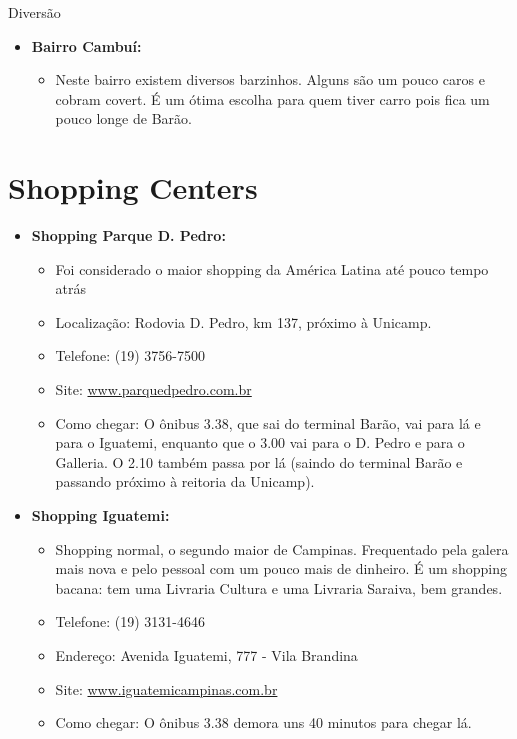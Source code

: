 \begin{story}{Diversão}
\begin{itemize}
\begin{itemize}
\item \textbf{Bairro Cambuí:} 
\begin{itemize}
\item Neste bairro existem diversos barzinhos. Alguns são um pouco caros e cobram covert. É um ótima escolha para quem tiver carro pois fica um pouco longe de Barão.
\end{itemize}

\end{itemize}

\section*{Shopping Centers}

\begin{itemize}

\item \textbf{Shopping Parque D. Pedro:}
\begin{itemize}
\item Foi considerado o maior shopping da América Latina até pouco tempo atrás
\item Localização: Rodovia D. Pedro, km 137, próximo à Unicamp.
\item Telefone: (19) 3756-7500
\item Site: \url{www.parquedpedro.com.br}
\item Como chegar: O ônibus 3.38, que sai do terminal Barão, vai para lá e para o Iguatemi, enquanto que o 3.00 vai para o D. Pedro e para o Galleria. O 2.10 também passa por lá (saindo do terminal Barão e passando próximo à reitoria da Unicamp).
\end{itemize}

\item \textbf{Shopping Iguatemi:}
\begin{itemize}
\item Shopping normal, o segundo maior de Campinas. Frequentado pela galera mais nova e pelo pessoal com um pouco mais de dinheiro. É um shopping bacana: tem uma Livraria Cultura e uma Livraria Saraiva, bem grandes.
\item Telefone: (19) 3131-4646
\item Endereço: Avenida Iguatemi, 777 - Vila Brandina
\item Site: \url{www.iguatemicampinas.com.br}
\item Como chegar: O ônibus 3.38 demora uns 40 minutos para chegar lá.
\end{itemize}


\end{itemize}
\end{itemize}
\end{story}
